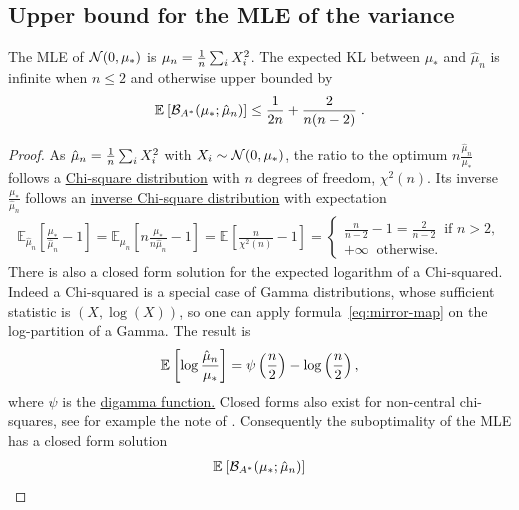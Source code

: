 \documentclass[twoside]{article}
\newcommand*{\expect}[2][]{\ensuremath{\mathbb{E}_{#1} \left[ #2 \right] }} %
\newcommand{\logpart}{A}
\newcommand{\bregmanconj}{\cB_{\logpart^*}}
\begin{document}
\subsection{Upper bound for the MLE of the variance}

	\begin{theorem}
	The MLE of ${\mathcal N}(0,\mu_*)$ is $\mu_n = \frac{1}{n} \sum_i X_i^2 $.
	The expected KL between $\mu_*$ and $\hat\mu_n$	is infinite when $n\leq 2$ and otherwise upper bounded by
	\begin{align}
		 \expect{\bregmanconj( \mu_*; \hat \mu_n) }
			\leq \inv{2n} +\frac{2}{n(n-2)} \; .
	\end{align}
	\end{theorem}
	
	\begin{proof}
	As $\hat \mu_n = \frac{1}{n} \sum_i X_i^2$ 
	with $X_i \sim {\mathcal N}(0, \mu_*)$, the ratio to the optimum $n \frac{\hat \mu_n}{\mu_*}$
	follows a \href{https://en.wikipedia.org/wiki/Chi-square_distribution}{Chi-square distribution} with $n$ degrees of freedom, $\chi^2(n)$. Its inverse $\frac{\mu_*}{\hat \mu_n} $ follows an \href{https://en.wikipedia.org/wiki/Inverse-chi-squared_distribution}{inverse Chi-square distribution} with expectation 
	\begin{align}
		\expect[\hat \mu_n]{\frac{\mu_*}{\hat \mu_n}  - 1}  
		= \expect[\mu_n]{n \frac{\mu_*}{n \hat \mu_n}  - 1} 
		= \expect{\frac{n}{\chi^2(n)} - 1} =
		\begin{cases}
			\frac{n}{n-2} -1 = \frac{2}{n-2} \ \text{ if } n>2, \\
			+\infty \  \text{ otherwise. }
		\end{cases}
	\end{align}
	There is also a closed form solution for the expected logarithm of a Chi-squared.
	Indeed a Chi-squared is a special case of Gamma distributions, whose sufficient statistic is $(X, \log(X))$, so one can apply formula~\eqref{eq:mirror-map} on the log-partition of a Gamma. The result is
	\begin{align}
		\expect{\log \frac{\hat \mu_n}{\mu_*}} = \psi\paren{\half[n]} - \log\paren{\half[n]},
	\end{align}
	where $\psi$ is the \href{https://en.wikipedia.org/wiki/Digamma_function}{digamma function.}
	Closed forms also exist for non-central chi-squares, see for example the note of \citep{pav2015moments}.
	Consequently the suboptimality of the MLE has a closed form solution
	\begin{align}
	\expect{\bregmanconj( \mu_*; \hat \mu_n) }

\end{align}
\end{proof}
\end{document}
